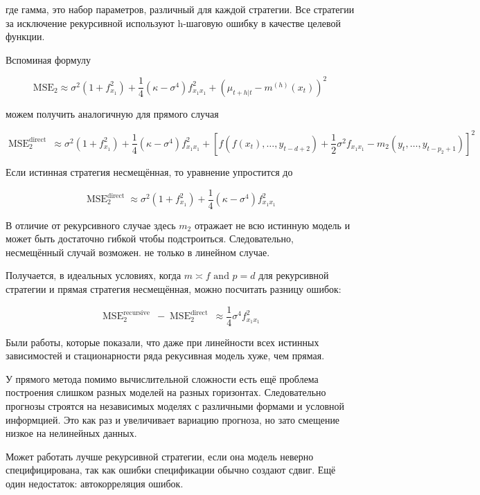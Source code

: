 \documentclass[a4paper,12pt]{article}
\begin{document}
где гамма, это набор параметров, различный для каждой стратегии. Все стратегии за исключение рекурсивной используют h-шаговую ошибку в качестве целевой функции.


Вспоминая формулу 

\[\mathrm{MSE}_{2} \approx \sigma^{2}\left(1+f_{x_{1}}^{2}\right)+\frac{1}{4}\left(\kappa-\sigma^{4}\right) f_{x_{1} x_{1}}^{2}+\left(\mu_{t+h | t}-m^{(h)}\left(x_{t}\right)\right)^{2}  \]

можем получить аналогичную для прямого случая

\[ \operatorname{MSE}_{2}^{\text {direct }} \approx \sigma^{2}\left(1+f_{x_{1}}^{2}\right)+\frac{1}{4}\left(\kappa-\sigma^{4}\right) f_{x_{1} x_{1}}^{2}+\left[f\left(f\left(x_{t}\right), \ldots, y_{t-d+2}\right)+\frac{1}{2} \sigma^{2} f_{x_{1} x_{1}}-m_{2}\left(y_{t}, \ldots, y_{t-p_{2}+1}\right)\right]^{2} \]

Если истинная стратегия несмещённая, то уравнение упростится до

\[  \operatorname{MSE}_{2}^{\operatorname{direct}} \approx \sigma^{2}\left(1+f_{x_{1}}^{2}\right)+\frac{1}{4}\left(\kappa-\sigma^{4}\right) f_{x_{1} x_{1}}^{2} \]

В отличие от рекурсивного случае здесь $ m_2 $ отражает не всю истинную модель и может быть достаточно гибкой чтобы подстроиться. Следовательно, несмещённый случай возможен. не только в линейном случае. 

Получается, в идеальных условиях, когда $ m \asymp f \text { and } p=d $ для рекурсивной стратегии и прямая стратегия несмещённая, можно посчитать разницу ошибок:

\[ \operatorname{MSE}_{2}^{\text {recursive }}-\operatorname{MSE}_{2}^{\text {direct }} \approx \frac{1}{4} \sigma^{4} f_{x_{1} x_{1}}^{2} \]


Были работы, которые показали, что даже при линейности всех истинных зависимостей и стационарности ряда рекусивная модель хуже, чем прямая.

У прямого метода помимо вычислительной сложности есть ещё проблема построения слишком разных моделей на разных горизонтах. Следовательно прогнозы строятся на независимых моделях с различными формами и условной информцией. Это как раз и увеличивает вариацию прогноза, но зато смещение низкое на нелинейных данных.	

Может работать лучше рекурсивной стратегии, если она модель неверно специфицирована, так как ошибки спецификации обычно создают сдвиг. Ещё один недостаток: автокорреляция ошибок.
\end{document}
